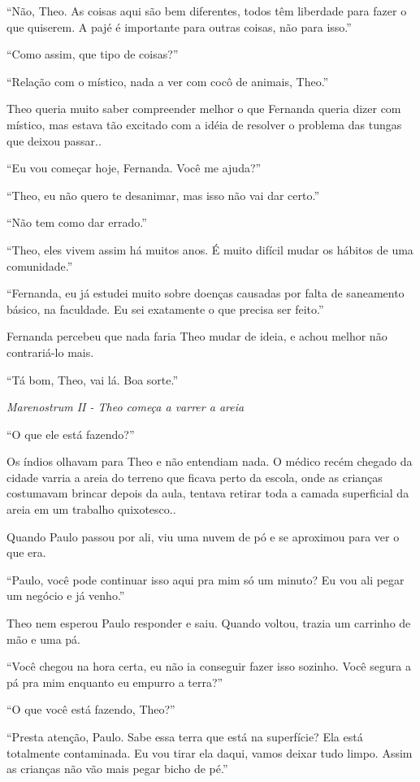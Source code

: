 ``Não, Theo. As coisas aqui são bem diferentes, todos têm liberdade para
fazer o que quiserem. A pajé é importante para outras coisas, não para
isso.''

``Como assim, que tipo de coisas?''

``Relação com o místico, nada a ver com cocô de animais, Theo.''

Theo queria muito saber compreender melhor o que Fernanda queria dizer
com místico, mas estava tão excitado com a idéia de resolver o problema
das tungas que deixou passar..

``Eu vou começar hoje, Fernanda. Você me ajuda?''

``Theo, eu não quero te desanimar, mas isso não vai dar certo.''

``Não tem como dar errado.''

``Theo, eles vivem assim há muitos anos. É muito difícil mudar os
hábitos de uma comunidade.''

``Fernanda, eu já estudei muito sobre doenças causadas por falta de
saneamento básico, na faculdade. Eu sei exatamente o que precisa ser
feito.''

Fernanda percebeu que nada faria Theo mudar de ideia, e achou melhor não
contrariá-lo mais.

``Tá bom, Theo, vai lá. Boa sorte.''

\asterisc

\emph{Marenostrum II - Theo começa a varrer a areia}

``O que ele está fazendo?''

Os índios olhavam para Theo e não entendiam nada. O médico recém chegado
da cidade varria a areia do terreno que ficava perto da escola, onde as
crianças costumavam brincar depois da aula, tentava retirar toda a
camada superficial da areia em um trabalho quixotesco..

Quando Paulo passou por ali, viu uma nuvem de pó e se aproximou para ver
o que era.

``Paulo, você pode continuar isso aqui pra mim só um minuto? Eu vou ali
pegar um negócio e já venho.''

Theo nem esperou Paulo responder e saiu. Quando voltou, trazia um
carrinho de mão e uma pá.

``Você chegou na hora certa, eu não ia conseguir fazer isso sozinho.
Você segura a pá pra mim enquanto eu empurro a terra?''

``O que você está fazendo, Theo?''

``Presta atenção, Paulo. Sabe essa terra que está na superfície? Ela
está totalmente contaminada. Eu vou tirar ela daqui, vamos deixar tudo
limpo. Assim as crianças não vão mais pegar bicho de pé.''

